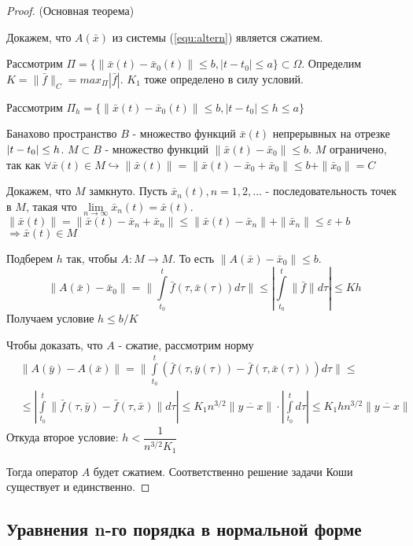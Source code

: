 \begin{proof}
	(Основная теорема)
	
	Докажем, что $A(\bar{x})$ из системы (\ref{equ:altern}) является сжатием.
	
	Рассмотрим $\Pi = \{\|\bar{x}(t) - \bar{x}_0(t)\| \le b, |t-t_0| \le a   \} \subset \Omega$. Определим $K = \|\bar{f}\|_C = max_{\Pi}|\bar{f}|$. $K_1$ тоже определено в силу условий.
	
	Рассмотрим $\Pi_h = \{\|\bar{x}(t) - \bar{x}_0(t)\| \le b, |t-t_0| \le h \le a   \}$
	
	Банахово пространство $B$ - множество функций $\bar{x}(t)$ непрерывных на отрезке $|t-t_0|\hm\le h$. $M \subset B$ - множество функций $\|\bar{x}(t) - \bar{x}_0\| \le b$. $M$ ограничено, так как $\forall \bar{x}(t) \in M \hookrightarrow \|\bar{x}(t)\| = \|\bar{x}(t) - \bar{x}_0 + \bar{x}_0\| \le b + \|\bar{x}_0\| = C$
	
	Докажем, что $M$ замкнуто. Пусть $\bar{x}_n(t), n = 1, 2, \dots$ - последовательность точек в $M$, такая что $\lim\limits_{n\to \infty} \bar{x}_n(t) = \bar{x}(t)$. $\|\bar{x}(t)\| = \|\bar{x}(t) - \bar{x}_n + \bar{x}_n\| \le \|\bar{x}(t) - \bar{x}_n\| + \|\bar{x}_n\| \le \varepsilon + b$ $\Rightarrow \bar{x}(t) \in M$
	
	Подберем $h$ так, чтобы $A:M\to M$. То есть $\|A(\bar{x}) - \bar{x}_0\| \le b$.
	\[
		\|A(\bar{x}) - \bar{x}_0\| = \|\int\limits_{t_0}^t \bar{f}(\tau, \bar{x}(\tau))d\tau\| \le |\int\limits_{t_0}^t \|\bar{f}\|d\tau| \le Kh
	\]
	Получаем условие $h\le b/K$
	
	Чтобы доказать, что $A$ - сжатие, рассмотрим норму
	\begin{align*}
		&\|A(\bar{y}) - A(\bar{x})\| = \|\int\limits_{t_0}^t(\bar{f}(\tau, \bar{y}(\tau)) - \bar{f}(\tau, \bar{x}(\tau)))d\tau\|\le \\ &\le |\int\limits_{t_0}^t \|\bar{f}(\tau, \bar{y}) - \bar{f}(\tau, \bar{x})\|d\tau| \le K_1n^{3/2}\|\overline{y-x}\|\cdot|\int\limits_{t_0}^td\tau| \le K_1hn^{3/2}\|\overline{y-x}\|
	\end{align*}
	Откуда второе условие: $h < \dfrac{1}{n^{3/2}K_1}$
	
	Тогда оператор $A$ будет сжатием. Соответственно решение задачи Коши существует и единственно.
	
\end{proof}

\subsection{Уравнения n-го порядка в нормальной форме}

